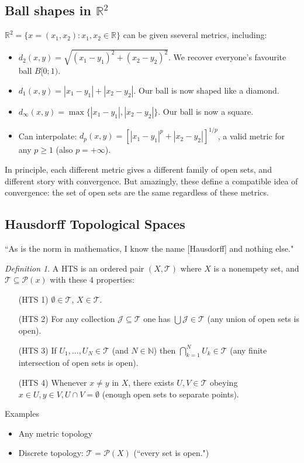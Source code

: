 \documentclass{article}
\theoremstyle{plain}
\theoremstyle{remark}
\newtheorem{definition}{Definition}
\newcommand{\N}{{\mathbb N}}
\newcommand{\R}{{\mathbb R}}
\begin{document}
\subsection{Ball shapes in $\R^2$}
$\R^2 = \{x = (x_1,x_2) \colon x_1,x_2 \in \R\}$ can be given sseveral metrics, including:
\begin{itemize}
	\item $d_2(x,y) = \sqrt{(x_1 - y_1)^2 + (x_2 - y_2)^2}$.
		We recover everyone's favourite ball $B[0;1)$.
	\item $d_1(x,y) = |x_1 - y_1| + |x_2 - y_2|$.
		Our ball is now shaped like a diamond.
	\item $d_\infty(x,y) = \max\{|x_1-y_1|, |x_2-y_2|\}$.
		Our ball is now a square.
	\item Can interpolate: $d_p(x,y) = \left[|x_1-y_1|^p + |x_2 - y_2|\right]^{1/p}$,
		a valid metric for any $p \geq 1$ (also $p = +\infty$).
\end{itemize}

In principle, each different metric gives a different family of open sets,
and different story with convergence.
But amazingly, these define a compatible idea of convergence:
the set of open sets are the same regardless of these metrics.

\subsection{Hausdorff Topological Spaces}
``As is the norm in mathematics, I know the name [Hausdorff]
and nothing else."
\begin{definition}
	A HTS is an ordered pair $(X,\mathcal{T})$ where $X$ is a
	nonempety set, and $\mathcal{T} \subseteq \mathcal{P}(x)$
	with these $4$ properties:
	\begin{enumerate}
		\item[(HTS 1)] $\emptyset \in \mathcal{T}$, $X \in \mathcal{T}$.
		\item[(HTS 2)] For any collection $\mathcal{J} \subseteq \mathcal{T}$
			one has $\bigcup \mathcal{J} \in \mathcal{T}$
			(any union of open sets is open).
		\item[(HTS 3)] If $U_1,\dots,U_N \in \mathcal{T}$ (and $N \in \N$)
			then $\bigcap_{k=1}^N U_k \in \mathcal{T}$
			(any finite intersection of open sets is open).
		\item[(HTS 4)] Whenever $x \neq y$ in $X$,
			there exists $U,V \in \mathcal{T}$ obeying
			$x \in U, y \in V, U \cap V = \emptyset$
			(enough open sets to separate points).
	\end{enumerate}
\end{definition}
Examples
\begin{itemize}
	\item Any metric topology
	\item Discrete topology: $\mathcal{T} = \mathcal{P}(X)$
		(``every set is open.")
\end{itemize}
\end{document}
